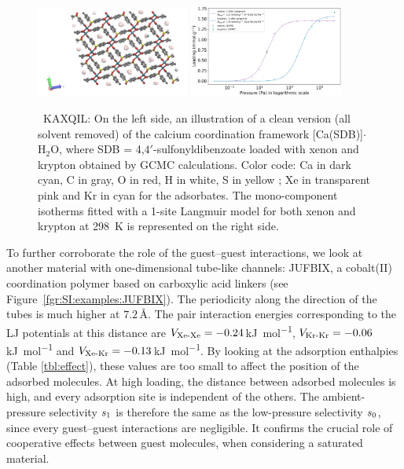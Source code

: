 \documentclass[main.tex]{subfiles}
\begin{document}
  \begin{figure}[h]
    \centering
      \includegraphics[width=0.45\textwidth]{figures/2-thermo/KAXQIL_clean.jpg}
      \includegraphics[width=0.45\textwidth]{figures/2-thermo/KAXQIL_clean_isotherm_xenon_krypton_298K.jpg}
      \caption{\ KAXQIL: On the left side, an illustration of a clean version (all solvent removed) of the calcium coordination framework [Ca(SDB)]$\cdot$H$_2$O, where SDB = 4,$4'$-sulfonyldibenzoate loaded with xenon and krypton obtained by GCMC calculations. Color code: Ca in dark cyan, C in gray, O in red, H in white, S in yellow ; Xe in transparent pink and Kr in cyan for the adsorbates. The mono-component isotherms fitted with a 1-site Langmuir model for both xenon and krypton at \SI{298}{\kelvin} is represented on the right side.}
      \label{fgr:SI:examples:KAXQIL}
    \end{figure}

  To further corroborate the role of the guest--guest interactions, we look at another material with one-dimensional tube-like channels: JUFBIX, a cobalt(II) coordination polymer based on carboxylic acid linkers (see Figure~\ref{fgr:SI:examples:JUFBIX}).\cite{JUFBIX} The periodicity along the direction of the tubes is much higher at $7.2$\,\si{\angstrom}. The pair interaction energies corresponding to the LJ potentials at this distance are $V_{\text{Xe-Xe}}=-0.24$\,\si{\kilo\joule\per\mol}, $V_{\text{Kr-Kr}}=-0.06$\,\si{\kilo\joule\per\mol} and $V_{\text{Xe-Kr}}=-0.13$\,\si{\kilo\joule\per\mol}. By looking at the adsorption enthalpies (Table \ref{tbl:effect}), these values are too small to affect the position of the adsorbed molecules. At high loading, the distance between adsorbed molecules is high, and every adsorption site is independent of the others. The ambient-pressure selectivity $s_{\text{1}}$ is therefore the same as the low-pressure selectivity $s_{\text{0}}$, since every guest--guest interactions are negligible. It confirms the crucial role of cooperative effects between guest molecules, when considering a saturated material.
\end{document}
